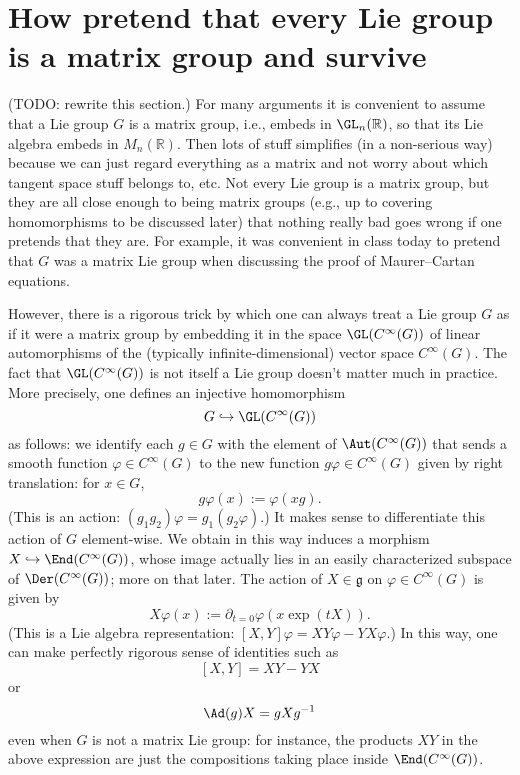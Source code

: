 \documentclass[reqno]{amsart} 
\begin{document}
\section{How pretend that every Lie group is a matrix group and survive\label{sec:pretend-lie-groups-are-matrix-groups}}
\label{sec:org7275cd0}
(TODO: rewrite this section.)
For many arguments it is convenient to assume that
a Lie group $G$ is a matrix group, i.e., embeds in $\GL_n(\mathbb{R})$,
so that its Lie algebra embeds in $M_n(\mathbb{R})$.
Then lots of stuff simplifies
(in a non-serious way) because we can just regard
everything as a matrix and not worry about
which tangent space stuff belongs to, etc.
Not every Lie group is a matrix group,
but they are all close enough to being matrix groups (e.g., up
to covering homomorphisms
to be discussed later) that nothing really bad goes wrong
if one pretends that they are.
For example, it was convenient in class today to pretend that $G$
was a matrix Lie group when discussing the proof of Maurer--Cartan equations.

However, there is a rigorous
trick by which one can always
treat a Lie group $G$ as if it were a matrix group
by embedding it in the space $\GL(C^\infty(G))$
of linear automorphisms
of the (typically infinite-dimensional)
vector space $C^\infty(G)$.
The fact that $\GL(C^\infty(G))$
is not itself a Lie group doesn't matter much in practice.
More precisely, one defines an injective homomorphism
\begin{equation*}
  G \hookrightarrow \GL(C^\infty(G))
\end{equation*}
as follows:
we identify each $g \in G$ with the element of $\Aut(C^\infty(G))$
that sends a smooth function $\varphi \in C^\infty(G)$
to the new function $g \varphi \in C^\infty(G)$
given by right translation:
for $x \in G$,
\begin{equation*}
  g \varphi(x) := \varphi(x g).
\end{equation*}
(This is an action: $(g_1 g_2) \varphi = g_1 (g_2 \varphi)$.)
It makes sense to differentiate this action of $G$ element-wise.
We obtain in this way induces a morphism
$X \hookrightarrow \End(C^\infty(G))$,
whose image actually lies in
an easily characterized
subspace of
$\Der(C^\infty(G))$; more on that later.
The action of $X \in \mathfrak{g}$ on $\varphi \in C^\infty(G)$
is given by
\begin{equation*}
  X \varphi(x) := \partial_{t=0}
  \varphi(x \exp(t X)).
\end{equation*}
(This is a Lie algebra representation:
$[X,Y] \varphi = X Y \varphi - Y X \varphi$.)
In this way, one can make perfectly rigorous sense
of identities such as
\begin{equation*}
  {} [X,Y] = X Y - Y X
\end{equation*}
or
\begin{equation*}
  \Ad(g) X = g X g^{-1}
\end{equation*}
even when $G$ is not a matrix Lie group:
for instance, the products $X Y$ in the above expression
are just the compositions taking place inside
$\End(C^\infty(G))$.
\end{document}
